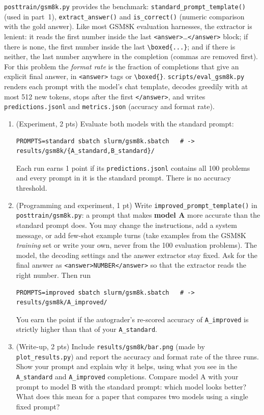 \documentclass[11pt]{article}
\newcommand{\file}[1]{\texttt{#1}}
\begin{document}
\file{posttrain/gsm8k.py} provides the benchmark: \texttt{standard\_prompt\_template()} (used in
part~1), \texttt{extract\_answer()} and \texttt{is\_correct()} (numeric comparison with the gold answer).
Like most GSM8K evaluation harnesses, the extractor is lenient: it reads the first number inside the last
\texttt{<answer>}\ldots\texttt{</answer>} block; if there is none, the first number inside the last
\verb|\boxed{...}|; and if there is neither, the last number anywhere in the completion (commas are removed
first). For this problem the \emph{format rate} is the fraction of completions that give an explicit final
answer, in \texttt{<answer>} tags or \verb|\boxed{}|. \file{scripts/eval\_gsm8k.py} renders each prompt with
the model's chat template, decodes greedily with at most 512 new tokens, stops after the first
\texttt{</answer>}, and writes \file{predictions.jsonl} and \file{metrics.json} (accuracy and format rate).
\begin{enumerate}
  \item (Experiment, 2 pts) Evaluate both models with the standard prompt:
\begin{lstlisting}
PROMPTS=standard sbatch slurm/gsm8k.sbatch   # -> results/gsm8k/{A_standard,B_standard}/\end{lstlisting}
        Each run earns 1 point if its \file{predictions.jsonl} contains all 100 problems and every prompt in it
        is the standard prompt. There is no accuracy threshold.
  \item (Programming and experiment, 1 pt) Write \texttt{improved\_prompt\_template()} in
        \file{posttrain/gsm8k.py}: a prompt that makes \textbf{model A} more accurate than the standard prompt
        does. You may change the instructions, add a system message, or add few-shot example turns (take
        examples from the GSM8K \emph{training} set or write your own, never from the 100 evaluation problems).
        The model, the decoding settings and the answer extractor stay fixed. Ask for the final answer as
        \texttt{<answer>NUMBER</answer>} so that the extractor reads the right number. Then run
\begin{lstlisting}
PROMPTS=improved sbatch slurm/gsm8k.sbatch   # -> results/gsm8k/A_improved/\end{lstlisting}
        You earn the point if the autograder's re-scored accuracy of \file{A\_improved} is strictly higher than
        that of your \file{A\_standard}.
  \item (Write-up, 2 pts) Include \file{results/gsm8k/bar.png} (made by \file{plot\_results.py}) and report
        the accuracy and format rate of the three runs. Show your prompt and explain why it helps, using what you
        see in the \file{A\_standard} and \file{A\_improved} completions. Compare model A with your prompt to
        model B with the standard prompt: which model looks better? What does this mean for a paper that
        compares two models using a single fixed prompt?
\end{enumerate}
\end{document}
